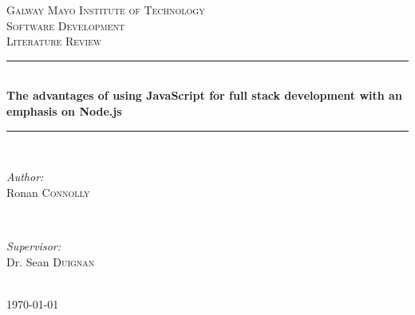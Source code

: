 \documentclass[12pt]{article} %
\begin{document}

\begin{titlepage}

\newcommand{\HRule}{\rule{\linewidth}{0.5mm}} %

\center %

\textsc{\LARGE Galway Mayo Institute of Technology}\\[1.5cm] %
\textsc{\Large Software Development}\\[0.5cm] %
\textsc{\large Literature Review}\\[0.5cm] %

\HRule \\[0.4cm]
{ \LARGE \bfseries The advantages of using JavaScript for full stack development with an emphasis on Node.js}\\[0.4cm] %
\HRule \\[1.5cm]

\begin{minipage}{0.4\textwidth}
\begin{flushleft} \large
\emph{Author:}\\
Ronan \textsc{Connolly} %
\end{flushleft}
\end{minipage}
~
\begin{minipage}{0.4\textwidth}
\begin{flushright} \large
\emph{Supervisor:} \\
Dr. Sean \textsc{Duignan} %
\end{flushright}
\end{minipage}\\[4cm]

{\large \today}\\[3cm] %


\vfill %

\end{titlepage}
\end{document}
